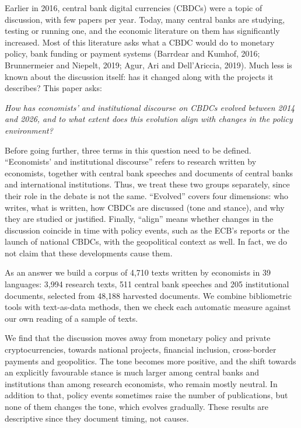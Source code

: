 \documentclass[11pt,a4paper]{article}
\begin{document}
Earlier in 2016, central bank digital currencies (CBDCs) were a topic of discussion, with few papers per year. 
Today, many central banks are studying, testing or running one, and the economic literature on them has 
significantly increased. Most of this literature asks what a CBDC would do to monetary policy, bank funding or 
payment systems (Barrdear and Kumhof, 2016; Brunnermeier and Niepelt, 2019; Agur, Ari and Dell’Ariccia, 2019). 
Much less is known about the discussion itself: has it changed along with the projects it describes? This paper 
asks:

\emph{How has economists’ and institutional discourse on CBDCs evolved between 2014 and 2026, and to what extent does 
this evolution align with changes in the policy environment?}

Before going further, three terms in this question need to be defined. “Economists’ and institutional discourse” 
refers to research written by economists, together with central bank speeches and documents of central banks and 
international institutions. Thus, we treat these two groups separately, since their role in the debate is not 
the same. “Evolved” covers four dimensions: who writes, what is written, how CBDCs are discussed (tone and 
stance), and why they are studied or justified. Finally, “align” means whether changes in the discussion 
coincide in time with policy events, such as the ECB’s reports or the launch of national CBDCs, with the 
geopolitical context as well. In fact, we do not claim that these developments cause them.

As an answer we build a corpus of 4,710 texts written by economists in 39 languages: 3,994 research texts, 511 
central bank speeches and 205 institutional documents, selected from 48,188 harvested documents. We combine 
bibliometric tools with text-as-data methods, then we check each automatic measure against our own reading of a 
sample of texts.

We find that the discussion moves away from monetary policy and private cryptocurrencies, towards national 
projects, financial inclusion, cross-border payments and geopolitics. The tone becomes more positive, and the 
shift towards an explicitly favourable stance is much larger among central banks and institutions than among 
research economists, who remain mostly neutral. In addition to that, policy events sometimes raise the number 
of publications, but none of them changes the tone, which evolves gradually. These results are descriptive 
since they document timing, not causes.
\end{document}
